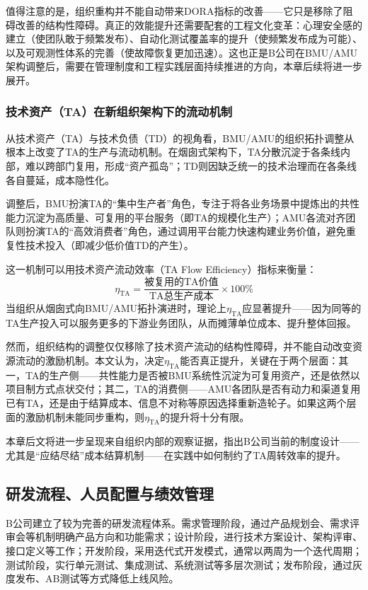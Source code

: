 值得注意的是，组织重构并不能自动带来DORA指标的改善——它只是移除了阻碍改善的结构性障碍。真正的效能提升还需要配套的工程文化变革：心理安全感的建立（使团队敢于频繁发布）、自动化测试覆盖率的提升（使频繁发布成为可能）、以及可观测性体系的完善（使故障恢复更加迅速）。这也正是B公司在BMU/AMU架构调整后，需要在管理制度和工程实践层面持续推进的方向，本章后续将进一步展开。

\subsubsection{技术资产（TA）在新组织架构下的流动机制}

从技术资产（TA）与技术负债（TD）的视角看，BMU/AMU的组织拓扑调整从根本上改变了TA的生产与流动机制。在烟囱式架构下，TA分散沉淀于各条线内部，难以跨部门复用，形成“资产孤岛”；TD则因缺乏统一的技术治理而在各条线各自蔓延，成本隐性化。

调整后，BMU扮演TA的“集中生产者”角色，专注于将各业务场景中提炼出的共性能力沉淀为高质量、可复用的平台服务（即TA的规模化生产）；AMU各流对齐团队则扮演TA的“高效消费者”角色，通过调用平台能力快速构建业务价值，避免重复性技术投入（即减少低价值TD的产生）。

这一机制可以用技术资产流动效率（TA Flow Efficiency）指标来衡量：
\begin{equation}
\eta_{\mathrm{TA}} = \frac{\text{被复用的TA价值}}{\text{TA总生产成本}} \times 100\%
\label{eq:ta-flow-efficiency}
\end{equation}
当组织从烟囱式向BMU/AMU拓扑演进时，理论上$\eta_{\mathrm{TA}}$应显著提升——因为同等的TA生产投入可以服务更多的下游业务团队，从而摊薄单位成本、提升整体回报。

然而，组织结构的调整仅仅移除了技术资产流动的结构性障碍，并不能自动改变资源流动的激励机制。本文认为，决定$\eta_{\mathrm{TA}}$能否真正提升，关键在于两个层面：其一，TA的生产侧——共性能力是否被BMU系统性沉淀为可复用资产，还是依然以项目制方式点状交付；其二，TA的消费侧——AMU各团队是否有动力和渠道复用已有TA，还是由于结算成本、信息不对称等原因选择重新造轮子。如果这两个层面的激励机制未能同步重构，则$\eta_{\mathrm{TA}}$的提升将十分有限。

本章后文将进一步呈现来自组织内部的观察证据，指出B公司当前的制度设计——尤其是“应结尽结”成本结算机制——在实践中如何制约了TA周转效率的提升。

\subsection{研发流程、人员配置与绩效管理}

B公司建立了较为完善的研发流程体系。需求管理阶段，通过产品规划会、需求评审会等机制明确产品方向和功能需求；设计阶段，进行技术方案设计、架构评审、接口定义等工作；开发阶段，采用迭代式开发模式，通常以两周为一个迭代周期；测试阶段，实行单元测试、集成测试、系统测试等多层次测试；发布阶段，通过灰度发布、AB测试等方式降低上线风险。


